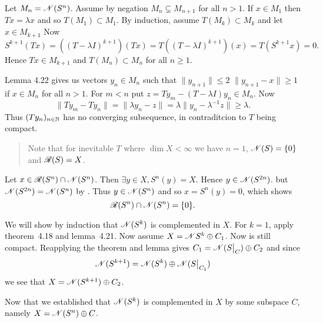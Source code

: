 \begin{enumerate}
\begin{itemize}
Let \(M_n = \mathscr{N}(S^n)\).
Assume by negation \(M_n \subsetneq M_{n+1}\) for all \(n>1\).
If \(x\in M_1\) then \(Tx = \lambda x\) and so \(T(M_1) \subset M_1\).
By induction, assume \(T(M_k) \subset M_k\) and let \(x\in M_{k+1}\)
Now
\begin{equation*}
S^{k+1}(Tx)
 = \left((T - \lambda I)^{k+1}\right)(Tx)
 = T\left((T - \lambda I)^{k+1}\right)(x)
 = T(S^{k+1} x) = 0.
\end{equation*}
Hence \(Tx \in M_{k+1}\) and  \(T(M_n) \subset M_n\) for all \(n \geq 1\).

Lemma 4.22 gives us 
vectors \(y_n \in M_n\) 
such that \(\|y_{n+1}\| \leq 2\) \(\|y_{n+1} - x\| \geq 1\) if \(x\in M_n\)
for all \(n>1\).
For \(m < n\) put \(z = Ty_m - (T - \lambda I)y_n \in M_n\).
Now
\begin{equation*}
\|Ty_m - Ty_n\| = \|\lambda y_n - z\| 
 = \lambda \| y_n - \lambda^{-1}z \| \geq \lambda.
\end{equation*}
Thus \((Ty_n)_{n\in\mathbb{N}}\) has no converging subsequence, 
in contraditcion to $T$ being compact.

\begin{quote}
Note that for inevitable $T$ where \(\dim X < \infty\)
we have \(n=1\), \(\mathscr{N}(S) = \{0\}\) and \(\mathscr{R}(S) = X\).
\end{quote}

Let \(x \in \mathscr{R}(S^n)\cap \mathscr{N}(S^n)\).
Then \(\exists y\in X, S^n(y) = X\).
Hence \(y\in \mathscr{N}(S^{2n})\). but \(\mathscr{N}(S^{2n})=\mathscr{N}(S^n)\) by .
Thus \(y\in \mathscr{N}(S^n)\) and so \(x = S^n(y) = 0\), which shows
\begin{equation*}
\mathscr{R}(S^n)\cap \mathscr{N}(S^n) = \{0\}.
\end{equation*}

We will show by induction that \(\mathscr{N}(S^k)\) is complemented in $X$.
For \(k=1\), apply theorem~4.18 and lemma~4.21.
Now assume \(X = \mathscr{N}{S^k} \oplus C_1\). Now 
is still compact. Reapplying the theorem and lemma 
gives \(C_1 = \scrN(\restr{S}{C}) \oplus C_2\) and since
\begin{equation*}
\scrN(S^{k+1}) = \scrN(S^k) \oplus \scrN(\restr{S}{C_1})
\end{equation*}
we see that \(X = \mathscr{N}(S^{k+1}) \oplus C_2\).

Now that we established that \(\mathscr{N}(S^k)\) is complemented in $X$
by some subspace $C$, namely \(X = \mathscr{N}(S^n) \oplus C\).

\end{itemize}


\end{enumerate}

